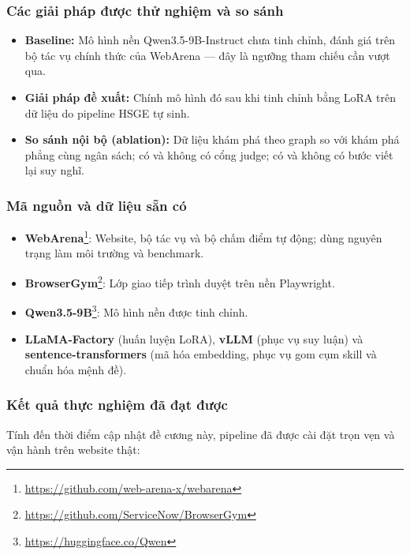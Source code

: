 \documentclass[14pt]{article}
\begin{document}
\subsubsection{Các giải pháp được thử nghiệm và so sánh}

\begin{itemize}[leftmargin=1.5cm, label=\textbullet]
    \item \textbf{Baseline:} Mô hình nền Qwen3.5-9B-Instruct chưa tinh chỉnh, đánh giá trên bộ tác vụ chính thức của WebArena --- đây là ngưỡng tham chiếu cần vượt qua.
    \item \textbf{Giải pháp đề xuất:} Chính mô hình đó sau khi tinh chỉnh bằng LoRA trên dữ liệu do pipeline HSGE tự sinh.
    \item \textbf{So sánh nội bộ (ablation):} Dữ liệu khám phá theo graph so với khám phá phẳng cùng ngân sách; có và không có cổng judge; có và không có bước viết lại suy nghĩ.
\end{itemize}

\subsubsection{Mã nguồn và dữ liệu sẵn có}

\begin{itemize}[leftmargin=1.5cm, label=\textbullet]
    \item \textbf{WebArena}\footnote{\url{https://github.com/web-arena-x/webarena}}: Website, bộ tác vụ và bộ chấm điểm tự động; dùng nguyên trạng làm môi trường và benchmark.
    \item \textbf{BrowserGym}\footnote{\url{https://github.com/ServiceNow/BrowserGym}}: Lớp giao tiếp trình duyệt trên nền Playwright.
    \item \textbf{Qwen3.5-9B}\footnote{\url{https://huggingface.co/Qwen}}: Mô hình nền được tinh chỉnh.
    \item \textbf{LLaMA-Factory} (huấn luyện LoRA), \textbf{vLLM} (phục vụ suy luận) và \textbf{sentence-transformers} (mã hóa embedding, phục vụ gom cụm skill và chuẩn hóa mệnh đề).
\end{itemize}

\subsubsection{Kết quả thực nghiệm đã đạt được}

Tính đến thời điểm cập nhật đề cương này, pipeline đã được cài đặt trọn vẹn và vận hành trên website thật:
\end{document}
